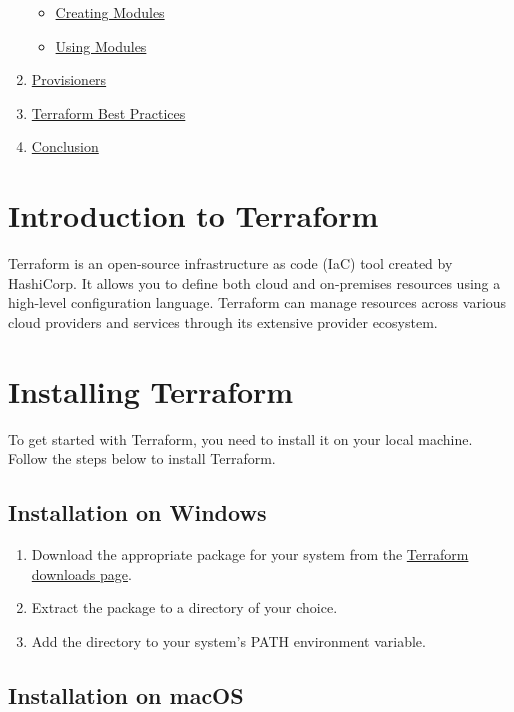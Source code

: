 \documentclass[
  letterpaper,
  DIV=11,
  numbers=noendperiod]{scrreprt}
\providecommand{\tightlist}{%
  \setlength{\itemsep}{0pt}\setlength{\parskip}{0pt}}\usepackage{longtable,booktabs,array}
\begin{document}
\begin{enumerate}
  \begin{itemize}
  \tightlist
  \item
    \hyperref[creating-modules]{Creating Modules}
  \item
    \hyperref[using-modules]{Using Modules}
  \end{itemize}
\item
  \hyperref[provisioners]{Provisioners}
\item
  \hyperref[terraform-best-practices]{Terraform Best Practices}
\item
  \hyperref[conclusion]{Conclusion}
\end{enumerate}

\section{Introduction to Terraform}\label{introduction-to-terraform}

Terraform is an open-source infrastructure as code (IaC) tool created by
HashiCorp. It allows you to define both cloud and on-premises resources
using a high-level configuration language. Terraform can manage
resources across various cloud providers and services through its
extensive provider ecosystem.

\section{Installing Terraform}\label{installing-terraform}

To get started with Terraform, you need to install it on your local
machine. Follow the steps below to install Terraform.

\subsection{Installation on Windows}\label{installation-on-windows}

\begin{enumerate}
\def\labelenumi{\arabic{enumi}.}
\tightlist
\item
  Download the appropriate package for your system from the
  \href{https://www.terraform.io/downloads.html}{Terraform downloads
  page}.
\item
  Extract the package to a directory of your choice.
\item
  Add the directory to your system's PATH environment variable.
\end{enumerate}

\subsection{Installation on macOS}\label{installation-on-macos}
\end{document}
